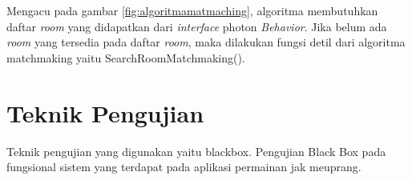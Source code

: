 Mengacu pada gambar \ref{fig:algoritmamatmaching}, algoritma membutuhkan daftar \textit{room} yang didapatkan dari \textit{interface} photon \textit{Behavior}. Jika belum ada \textit{room} yang tersedia pada daftar \textit{room}, maka dilakukan fungsi detil dari algoritma matchmaking yaitu SearchRoomMatchmaking(). 

    
    
    

        \section{Teknik Pengujian}
Teknik pengujian yang digunakan yaitu blackbox. Pengujian Black Box pada fungsional sistem yang terdapat pada aplikasi permainan jak meuprang.

